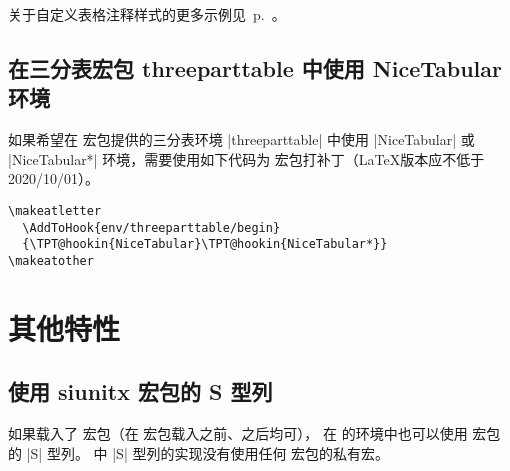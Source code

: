 \documentclass[dvipsnames]{article}%
\begin{document}
\bigskip
关于自定义表格注释样式的更多示例见~p.~\pageref{ex:notes}。

\subsection{在三分表宏包 threeparttable 中使用 NiceTabular 环境}


如果希望在  宏包提供的三分表环境 |threeparttable| 中使用 |{NiceTabular}| 或 |{NiceTabular*}| 环境，需要使用如下代码为  宏包打补丁（\LaTeX 版本应不低于 2020/10/01）。
\begin{Verbatim}[commandchars=\~\#\!]
\makeatletter
  \AddToHook{env/threeparttable/begin}
  {\TPT@hookin{NiceTabular}\TPT@hookin{NiceTabular*}}
\makeatother
\end{Verbatim}


\section{其他特性}

\subsection{使用 siunitx 宏包的 S 型列}

如果载入了  宏包（在  宏包载入之前、之后均可），
在  的环境中也可以使用  宏包的 |S| 型列。
  中 |S| 型列的实现没有使用任何  宏包的私有宏。
\end{document}
